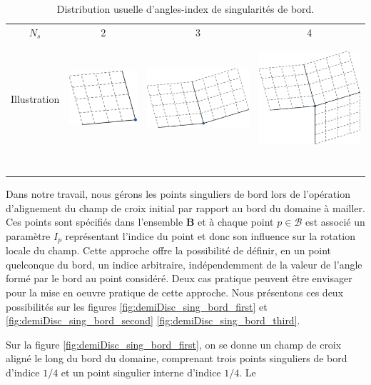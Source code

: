 \begin{table}[!h]
\begin{tabular}{|c|c|c|c|}
&&&\\
\hline
\multirow{2}{*}{$N_s$} & \multirow{2}{*}{2}   & \multirow{2}{*}{3}   & \multirow{2}{*}{4}   \\
&&&\\
\hline
&&&\\
&&&\\
\multirow{2}{*}{Illustration} & \multirow{2}{*}{\includegraphics[scale=0.25]{images/geogebra-export_1.pdf}}   & \multirow{2}{*}{\includegraphics[scale=0.2]{images/geogebra-export_2.pdf}}   & \multirow{2}{*}{\includegraphics[scale=0.2]{images/geogebra-export_3.pdf}}   \\
&                          &                        &                           \\
&&&\\
&&&\\
&&&\\
&&&\\
&&&\\
&&&\\
&&&\\
\hline
\end{tabular}
\caption{Distribution usuelle d'angles-index de singularités de bord.}
\label{tabul}
\end{table}

Dans notre travail, nous gérons les points singuliers de bord lors de l'opération d'alignement du champ de croix initial par rapport au bord du domaine à mailler. Ces points sont spécifiés dans l'ensemble $\mathbf{B}$ et à chaque point $p\in\mathcal{B}$ est associé un paramètre $I_p$ représentant l'indice du point et donc son influence sur la rotation locale du champ. Cette approche offre la possibilité de définir, en un point quelconque du bord, un indice arbitraire, indépendemment de la valeur de l'angle formé par le bord au point considéré. Deux cas pratique peuvent être envisager pour la mise en oeuvre pratique de cette approche. Nous présentons ces deux possibilités sur les figures \ref{fig:demiDisc_sing_bord_first} et \ref{fig:demiDisc_sing_bord_second} \ref{fig:demiDisc_sing_bord_third}.

Sur la figure \ref{fig:demiDisc_sing_bord_first}, on se donne un champ de croix aligné le long du bord du domaine, comprenant trois points singuliers de bord d'indice $1/4$ et un point singulier interne d'indice $1/4$. Le 